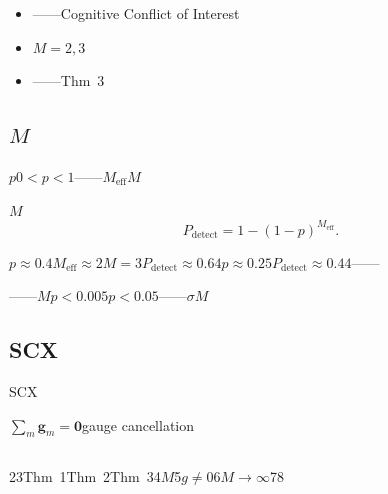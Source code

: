 \documentclass[12pt,a4paper]{article}
\theoremstyle{remark}
\newcommand{\sumgd}{\sum_m \mathbf{g}_m = \mathbf{0}}
\newcommand{\detectProb}{P_{\text{detect}}}
\newenvironment{honestbox}{%
    \medskip\noindent
    \color{red}
    \begin{minipage}{0.92\textwidth}
    \textbf{}
    \begin{itemize}[leftmargin=*]
}{%
    \end{itemize}
    \end{minipage}
    \medskip
}
\begin{document}
\begin{honestbox}
    \item ——\textbf{}Cognitive Conflict of Interest
    \item $M=2,3$
    \item \textit{}\textit{}——Thm~3
\end{honestbox}

\subsection{$M$}

$p$$0 < p < 1$——$M_{\text{eff}}$$M$

$M$
\begin{equation}
    \detectProb = 1 - (1 - p)^{M_{\text{eff}}}.
    \label{eq:naive_detection}
\end{equation}

$p \approx 0.4$$M_{\text{eff}} \approx 2$$M=3$$\detectProb \approx 0.64$\textbf{}$p \approx 0.25$$\detectProb \approx 0.44$——

——\textbf{$M$}$p < 0.005$$p < 0.05$——$\sigma$$M$

\subsection{SCX}

SCX~\cite{scx_equality_principle,scx_moe_gauge}

\begin{center}
\end{center}

$\sumgd$gauge cancellation

\subsection{}

23Thm~1Thm~2Thm~34$M$5$g \neq 0$6$M \to \infty$78

\section{}
\label{sec:framework}
\end{document}
